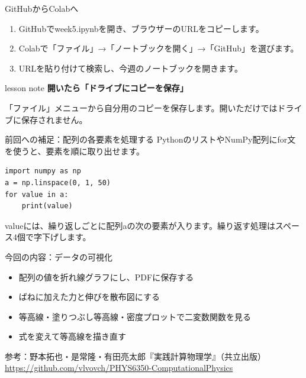 \documentclass[12pt,aspectratio=43]{beamer}
\newcommand{\code}[1]{{\codefont #1}}
\newenvironment{lessonbox}
  {\begin{beamercolorbox}[wd=\linewidth,sep=1.5mm]{lesson note}}
  {\end{beamercolorbox}\par}
\begin{document}
\begin{frame}[t]{GitHubからColabへ}
  \setlength{\parskip}{0pt}
  \begin{enumerate}
    \setlength{\itemsep}{4mm}
    \item GitHubで\code{week5.ipynb}を開き、ブラウザーのURLをコピーします。
    \item Colabで「ファイル」→「ノートブックを開く」→「GitHub」を選びます。
    \item URLを貼り付けて検索し、今週のノートブックを開きます。
  \end{enumerate}
  \vspace{3mm}
  \begin{lessonbox}
    \textbf{開いたら「ドライブにコピーを保存」}\par
    \small 「ファイル」メニューから自分用のコピーを保存します。開いただけではドライブに保存されません。
  \end{lessonbox}
\end{frame}

\begin{frame}[t,fragile]{前回への補足：配列の各要素を処理する}
  \setlength{\parskip}{0pt}
  PythonのリストやNumPy配列に\code{for}文を使うと、要素を順に取り出せます。
\begin{lstlisting}
import numpy as np
a = np.linspace(0, 1, 50)
for value in a:
    print(value)
\end{lstlisting}
  \vspace{1mm}
  \small \code{value}には、繰り返しごとに配列\code{a}の次の要素が入ります。繰り返す処理はスペース4個で字下げします。
\end{frame}

\begin{frame}[t]{今回の内容：データの可視化}
  \begin{itemize}
    \setlength{\itemsep}{3mm}
    \item 配列の値を折れ線グラフにし、PDFに保存する
    \item ばねに加えた力と伸びを散布図にする
    \item 等高線・塗りつぶし等高線・密度プロットで二変数関数を見る
    \item 式を変えて等高線を描き直す
  \end{itemize}
  \vfill
  {\footnotesize
    参考：野本拓也・是常隆・有田亮太郎『実践計算物理学』（共立出版）\\
    \url{https://github.com/vlvovch/PHYS6350-ComputationalPhysics}}
\end{frame}
\end{document}
